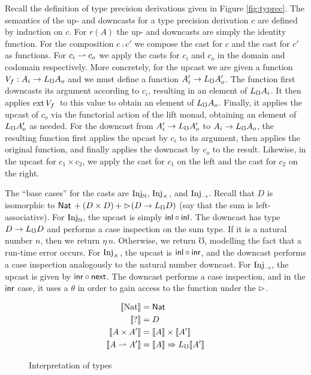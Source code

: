 Recall the definition of type precision derivations given in Figure
\ref{fig:typrec}. The semantics of the up- and downcasts for a type precision
derivation $c$ are defined by induction on $c$.
%
For $r(A)$ the up- and downcasts are simply the identity function. 
%
For the composition $c \comp c'$ we compose the cast for $c$ and the cast for
$c'$ as functions.
%
For $c_i \rightharpoonup c_o$ we apply the casts for $c_i$ and $c_o$ in the domain and
codomain respectively. More concretely, for the upcast we are given a function
$V_f : A_i \to L_\mho A_o$ and we must define a function $A_i' \to L_\mho A_o'$. The
function first downcasts its argument according to $c_i$, resulting in an
element of $L_\mho A_i$. It then applies $\text{ext}\,{V_f}\,{}$ to this value to obtain an
element of $L_\mho A_o$. Finally, it applies the upcast of $c_o$ via the functorial
action of the lift monad, obtaining an element of $L_\mho A_o'$ as needed. For the
downcast from $A_i' \to L_\mho A_o'$ to $A_i \to L_\mho A_o$, the resulting function
first applies the upcast by $c_i$ to its argument, then applies the original
function, and finally applies the downcast by $c_o$ to the result.
%
Likewise, in the upcast for $c_1 \times c_2$, we apply the cast for $c_1$ on the
left and the cast for $c_2$ on the right.

The ``base cases'' for the casts are $\text{Inj}_\mathbb{N}$, $\text{Inj}_\times$, and $\text{Inj}_\to$. Recall
that $D$ is isomorphic to $\mathsf{Nat}\, + (D \times D)\, + \vartriangleright \hspace{-0.2em} (D \to L_\mho D)$
(say that the sum is left-associative).
%
For $\text{Inj}_\mathbb{N}$, the upcast is simply $\mathsf{inl} \circ \mathsf{inl}$. The downcast has type $D
\to L_\mho D$ and performs a case inspection on the sum type. If it is a natural
number $n$, then we return $\eta\, n$. Otherwise, we return $\mho$, modelling
the fact that a run-time error occurs.
%
For $\text{Inj}_\times$, the upcast is $\mathsf{inl} \circ \mathsf{inr}$, and the downcast performs a case
inspection analogously to the natural number downcast.
%
For $\text{Inj}_\to$, the upcast is given by $\mathsf{inr} \circ \mathsf{next}$. The downcast performs a
case inspection, and in the $\mathsf{inr}$ case, it uses a $\theta$ in order to gain
access to the function under the $\vartriangleright$.


%


\begin{figure*}
  \begin{align*}
    \llbracket {\text{Nat}} \rrbracket &= \mathsf{Nat} \\
    \llbracket {?} \rrbracket &= D \\
    \llbracket {A \times A'} \rrbracket &= \llbracket {A} \rrbracket \times \llbracket {A'} \rrbracket \\ 
    \llbracket {A \rightharpoonup A'} \rrbracket &= \llbracket {A} \rrbracket \Rightarrow L_\mho \llbracket {A'} \rrbracket \\
  \end{align*}
  \caption{Interpretation of types}
  \label{fig:type-interpretation}
\end{figure*}
  
